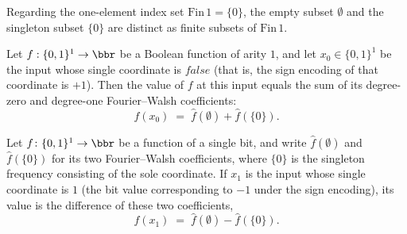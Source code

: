 \begin{lemma}
\label{BooleanAnalysis.Hypercontractivity.finsetFin1_ne}
\leanok
{}
Regarding the one-element index set $\mathrm{Fin}\,1 = \{0\}$, the empty subset
$\emptyset$ and the singleton subset $\{0\}$ are distinct as finite subsets of
$\mathrm{Fin}\,1$.
\end{lemma}

\begin{lemma}
\label{BooleanAnalysis.Hypercontractivity.one_bit_val_false}
\leanok
{}
Let $f:\{0,1\}^1\to\bbr$ be a Boolean function of arity $1$, and let $x_0\in\{0,1\}^1$
be the input whose single coordinate is $\mathit{false}$ (that is, the sign encoding of
that coordinate is $+1$). Then the value of $f$ at this input equals the sum of its
degree-zero and degree-one Fourier--Walsh coefficients:
\[
  f(x_0) \;=\; \hat f(\emptyset) + \hat f(\{0\}).
\]
\end{lemma}

\begin{lemma}
\label{BooleanAnalysis.Hypercontractivity.one_bit_val_true}
\leanok
{}
Let $f\colon\{0,1\}^1\to\bbr$ be a function of a single bit, and write $\hat
f(\emptyset)$ and $\hat f(\{0\})$ for its two Fourier--Walsh coefficients, where $\{0\}$
is the singleton frequency consisting of the sole coordinate. If $x_1$ is the input
whose single coordinate is $1$ (the bit value corresponding to $-1$ under the sign
encoding), its value is the difference of these two coefficients,
\[
  f(x_1) \;=\; \hat f(\emptyset) - \hat f(\{0\}).
\]
\end{lemma}


